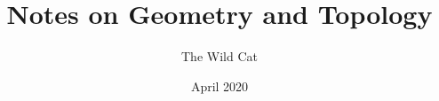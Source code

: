 \documentclass[12pt]{book}
\title{Notes on Geometry and Topology}
\author{The Wild Cat}
\date{April 2020}
\numberwithin{acounter}{chapter}
\begin{document}
\frontmatter
\maketitle
\tableofcontents
\mainmatter

\backmatter
\nocite{Sakai1996}


\end{document}
